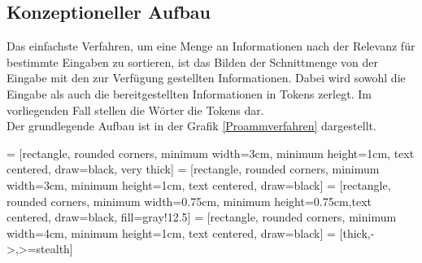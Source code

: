 \documentclass[a4paper,10pt]{article}
\begin{document}
    \subsection{Konzeptioneller Aufbau}
        Das einfachste Verfahren, um eine Menge an Informationen nach der Relevanz für bestimmte Eingaben zu sortieren, ist das Bilden der Schnittmenge von der Eingabe mit den zur Verfügung gestellten Informationen. Dabei wird sowohl die Eingabe als auch die bereitgestellten Informationen in Tokens zerlegt. Im vorliegenden Fall stellen die Wörter die Tokens dar.\\
        Der grundlegende Aufbau ist in der Grafik \ref{Proammverfahren} dargestellt.

         = [rectangle, rounded corners, minimum width=3cm, minimum height=1cm, text centered, draw=black, very thick]%
         = [rectangle, rounded corners, minimum width=3cm, minimum height=1cm, text centered, draw=black]
         = [rectangle, rounded corners, minimum width=0.75cm, minimum height=0.75cm,text centered, draw=black, fill=gray!12.5]
         = [rectangle, rounded corners, minimum width=4cm, minimum height=1cm, text centered, draw=black]
         = [thick,->,>=stealth]
\end{document}

